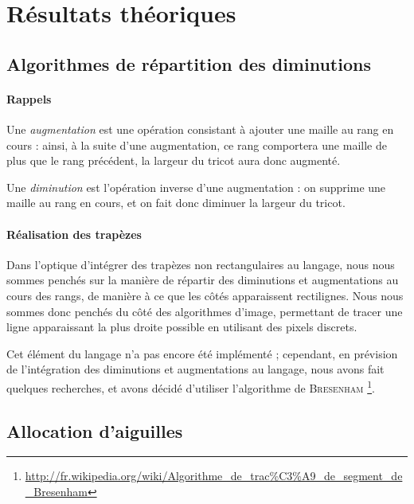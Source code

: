 \documentclass{article}
\begin{document}
\section{Résultats théoriques}

\subsection{Algorithmes de répartition des diminutions}

\paragraph{Rappels}

Une \emph{augmentation} est une opération consistant à ajouter une maille au rang en cours : ainsi, à la suite d'une 
augmentation, ce rang comportera une maille de plus que le rang précédent, la largeur du tricot aura donc augmenté.

Une \emph{diminution} est l'opération inverse d'une augmentation : on supprime une maille au rang en cours, et on fait 
donc diminuer la largeur du tricot.


\paragraph{Réalisation des trapèzes}

Dans l'optique d'intégrer des trapèzes non rectangulaires au langage, nous nous sommes penchés sur la manière de répartir des 
diminutions et augmentations au cours des rangs, de manière à ce que les côtés apparaissent rectilignes.
Nous nous sommes donc penchés du côté des algorithmes d'image, permettant de tracer une ligne apparaissant la plus droite 
possible en utilisant des pixels discrets.

Cet élément du langage n'a pas encore été implémenté ; cependant, en prévision de l'intégration des diminutions et augmentations 
au langage, nous avons fait quelques recherches, et avons décidé d'utiliser l'algorithme de \textsc{Bresenham}
\footnote{\url{http://fr.wikipedia.org/wiki/Algorithme_de_trac\%C3\%A9_de_segment_de_Bresenham}}.

\subsection{Allocation d'aiguilles}
\end{document}
